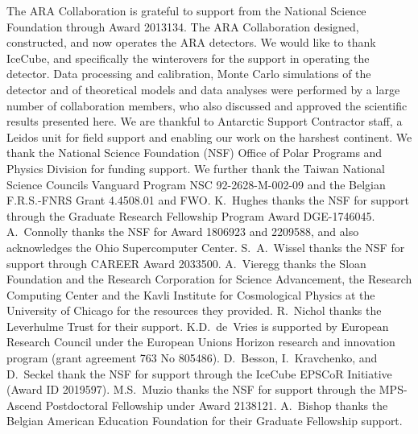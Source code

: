\noindent
The ARA Collaboration is grateful to support from the National Science Foundation through Award 2013134.
The ARA Collaboration designed, constructed, and now operates the ARA detectors. 
We would like to thank IceCube, and specifically the winterovers for the support in operating the detector. 
Data processing and calibration, Monte Carlo simulations of the detector and of theoretical models and data analyses were performed by a large number
of collaboration members, who also discussed and approved the scientific results presented here. 
We are thankful to Antarctic Support Contractor staff, a Leidos unit for field support and enabling our work on the harshest continent. 
We thank the National Science Foundation (NSF) Office of Polar Programs and Physics Division for funding support. 
We further thank the Taiwan National Science Councils Vanguard Program NSC 92-2628-M-002-09 and the Belgian F.R.S.-FNRS Grant 4.4508.01 and FWO. 
K.~Hughes thanks the NSF for support through the Graduate Research Fellowship Program Award DGE-1746045. 
A.~Connolly thanks the NSF for Award 1806923 and 2209588, and also acknowledges the Ohio Supercomputer Center. 
S.~A.~Wissel thanks the NSF for support through CAREER Award 2033500.
A.~Vieregg thanks the Sloan Foundation and the Research Corporation for Science Advancement, the Research Computing Center and the 
Kavli Institute for Cosmological Physics at the University of Chicago for the resources they provided. 
R.~Nichol thanks the Leverhulme Trust for their support. 
K.D.~de~Vries is supported by European Research Council under the European Unions Horizon research and innovation program (grant agreement 763 No 805486). 
D.~Besson, I.~Kravchenko, and D.~Seckel thank the NSF for support through the IceCube EPSCoR Initiative (Award ID 2019597). 
M.S.~Muzio thanks the NSF for support through the MPS-Ascend Postdoctoral Fellowship under Award 2138121. 
A.~Bishop thanks the Belgian American Education Foundation for their Graduate Fellowship support.
